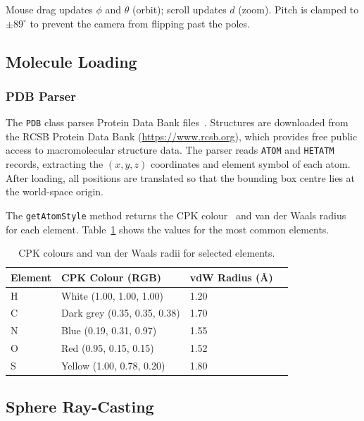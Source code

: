 \documentclass[12pt, a4paper]{article}
\begin{document}
Mouse drag updates $\phi$ and $\theta$ (orbit); scroll updates $d$ (zoom). Pitch is clamped to $\pm 89^\circ$ to prevent the camera from flipping past the poles.

\subsection{Molecule Loading}

\subsubsection{PDB Parser}

The \texttt{PDB} class parses Protein Data Bank files~\cite{pdb}. Structures are downloaded from the RCSB Protein Data Bank (\url{https://www.rcsb.org}), which provides free public access to macromolecular structure data. The parser reads \texttt{ATOM} and \texttt{HETATM} records, extracting the $(x, y, z)$ coordinates and element symbol of each atom. After loading, all positions are translated so that the bounding box centre lies at the world-space origin.

The \texttt{getAtomStyle} method returns the CPK colour~\cite{cpk} and van der Waals radius~\cite{bondi1964} for each element. Table~\ref{tab:cpk} shows the values for the most common elements.

\begin{table}[H]
    \centering
    \begin{tabular}{llll}
        \toprule
        Element & CPK Colour (RGB) & vdW Radius (\AA) \\
        \midrule
        H  & White  (1.00, 1.00, 1.00) & 1.20 \\
        C  & Dark grey (0.35, 0.35, 0.38) & 1.70 \\
        N  & Blue  (0.19, 0.31, 0.97) & 1.55 \\
        O  & Red   (0.95, 0.15, 0.15) & 1.52 \\
        S  & Yellow (1.00, 0.78, 0.20) & 1.80 \\
        \bottomrule
    \end{tabular}
    \caption{CPK colours and van der Waals radii for selected elements.}
    \label{tab:cpk}
\end{table}

\subsection{Sphere Ray-Casting}
\end{document}
